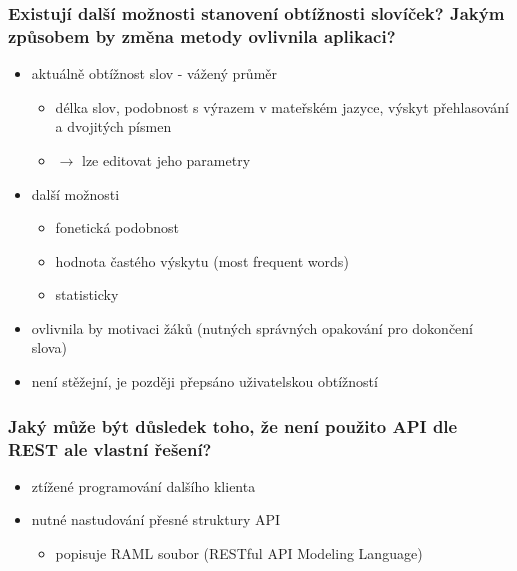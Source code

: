 \begin{frame}[noframenumbering]
    \frametitle{Existují další možnosti stanovení obtížnosti slovíček? Jakým způsobem by změna metody ovlivnila aplikaci?}

    \begin{itemize}
        \item aktuálně obtížnost slov - vážený průměr
        \begin{itemize}
            \item délka slov, podobnost s výrazem v mateřském jazyce, výskyt přehlasování a dvojitých písmen
            \item $\rightarrow$ lze editovat jeho parametry
        \end{itemize}
        \item další možnosti
        \begin{itemize}
            \item fonetická podobnost
            \item hodnota častého výskytu (most frequent words)
            \item statisticky
        \end{itemize}
        \item ovlivnila by motivaci žáků (nutných správných opakování pro dokončení slova)
        \item není stěžejní, je později přepsáno uživatelskou obtížností
    \end{itemize}
\end{frame}

\begin{frame}[noframenumbering]
    \frametitle{Jaký může být důsledek toho, že není použito API dle REST ale vlastní řešení?}
    \begin{itemize}
        \item ztížené programování dalšího klienta 
        \item nutné nastudování přesné struktury API 
        \begin{itemize}
            \item popisuje RAML soubor (RESTful API Modeling Language)
        \end{itemize}
    \end{itemize}
\end{frame}

